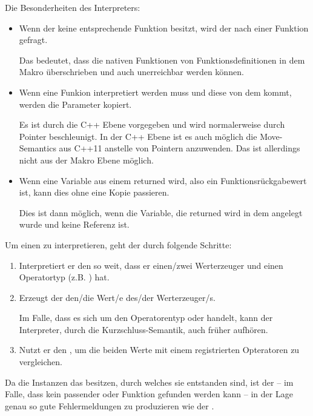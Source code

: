       Die Besonderheiten des Interpreters:
      \begin{itemize}
        \item Wenn der  keine entsprechende Funktion besitzt, wird der  nach einer Funktion gefragt.

          Das bedeutet, dass die nativen Funktionen von Funktionsdefinitionen in dem Makro überschrieben und auch unerreichbar werden können.
        \item Wenn eine Funkion interpretiert werden muss und diese von dem  kommt, werden die Parameter kopiert.

          Es ist durch die C++ Ebene vorgegeben und wird normalerweise durch Pointer beschleunigt. In der C++ Ebene ist es auch möglich die Move-Semantics\autocite[S.268 ff.]{C++14-std} aus C++11 anstelle von Pointern anzuwenden. Das ist allerdings nicht aus der Makro Ebene möglich.
        \item Wenn eine Variable aus einem  returned wird, also ein Funktionsrückgabewert ist, kann dies ohne eine Kopie passieren.

          Dies ist dann möglich, wenn die Variable, die returned wird in dem  angelegt wurde und keine Referenz ist.
      \end{itemize}

      Um einen  zu interpretieren, geht der  durch folgende Schritte:
      \begin{enumerate}
        \item Interpretiert er den  so weit, dass er einen/zwei Werterzeuger und einen Operatortyp (z.B. \myMinin{==}) hat.
        \item Erzeugt der  den/die Wert/e des/der Werterzeuger/s.

          Im Falle, dass es sich um den Operatorentyp \myMinin{&&} oder \myMinin{||} handelt, kann der Interpreter, durch die Kurzschluss-Semantik, auch früher aufhören.
        \item Nutzt er den , um die beiden Werte mit einem registrierten Opteratoren zu vergleichen.
      \end{enumerate}

      Da die  Instanzen das  besitzen, durch welches sie entstanden sind, ist der  -- im Falle, dass kein passender  oder Funktion gefunden werden kann -- in der Lage genau so gute Fehlermeldungen zu produzieren wie der .

